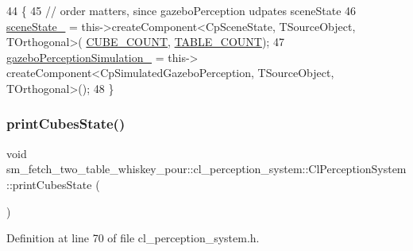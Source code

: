 \begin{DoxyCode}
44             \{
45                 \textcolor{comment}{// order matters, since gazeboPerception udpates sceneState}
46                 \hyperlink{classsm__fetch__two__table__whiskey__pour_1_1cl__perception__system_1_1ClPerceptionSystem_af60dc69df392f4bb2aae7220dd0ff847}{sceneState\_} = this->createComponent<CpSceneState, TSourceObject, TOrthogonal>(
      \hyperlink{namespacesm__fetch__two__table__whiskey__pour_ab6321f5657e6b4b621a9b084f81bdeb6}{CUBE\_COUNT}, \hyperlink{namespacesm__fetch__two__table__whiskey__pour_a17b0c4eed9dc45b1cdf81aeb8cab3fda}{TABLE\_COUNT});
47                 \hyperlink{classsm__fetch__two__table__whiskey__pour_1_1cl__perception__system_1_1ClPerceptionSystem_a8dfacb8944f2bb24958668539c72a026}{gazeboPerceptionSimulation\_} = this->
      createComponent<CpSimulatedGazeboPerception, TSourceObject, TOrthogonal>();
48             \}
\end{DoxyCode}
\mbox{\label{classsm__fetch__two__table__whiskey__pour_1_1cl__perception__system_1_1ClPerceptionSystem_a82afda9f4a97f212313b5912206e03a4}} 
\subsubsection{\texorpdfstring{print\+Cubes\+State()}{printCubesState()}}
{\footnotesize\ttfamily void sm\+\_\+fetch\+\_\+two\+\_\+table\+\_\+whiskey\+\_\+pour\+::cl\+\_\+perception\+\_\+system\+::\+Cl\+Perception\+System\+::print\+Cubes\+State (\begin{DoxyParamCaption}{ }\end{DoxyParamCaption})\hspace{0.3cm}{\ttfamily [inline]}}



Definition at line 70 of file cl\+\_\+perception\+\_\+system.\+h.



